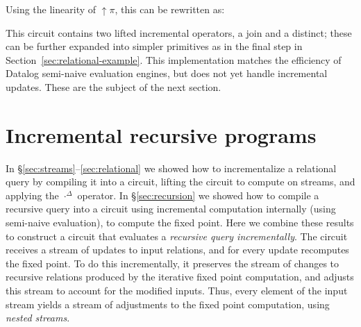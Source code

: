 \documentclass[twocolumn
]{svjour3}
\numberwithin{equation}{section}
\newcommand{\code}[1]{\mbox{\texttt{#1}}}
\newcommand{\zm}{\ensuremath{z^{-1}}} %
\newcommand{\inc}[1]{{#1}^{\Delta}}
\newcommand{\distinct}{\mathit{dist}}  %
\newcommand{\secref}[1]{\S\ref{#1}}  %
\newcommand{\lift}[1]{{\uparrow}#1}
\begin{document}
Using the linearity of $\lift\pi$, this can be rewritten as:

\noindent
{}

This circuit contains two lifted incremental operators, a join and a
distinct; these can be further expanded into simpler primitives as in
the final step in Section~\ref{sec:relational-example}.  This
implementation matches the efficiency of Datalog semi-naive evaluation
engines, but does not yet handle incremental updates.  These are the
subject of the next section.


%
\section{Incremental recursive programs}\label{sec:nested}

In \secref{sec:streams}--\ref{sec:relational}
we showed how to incrementalize a relational query by
compiling it into a circuit, lifting the circuit to compute on streams, and
applying the $\inc{\cdot}$ operator.  In \secref{sec:recursion} we showed
how to compile a recursive query into a circuit using incremental
computation internally (using semi-naive evaluation), to compute the fixed point.
Here we combine these results to construct a circuit that evaluates a \emph{recursive
query incrementally}.  The circuit receives a stream of updates to input
relations, and for every update recomputes the fixed point.  To do this
incrementally, it preserves the stream of changes to recursive relations
produced by the iterative fixed point computation, and adjusts this stream to
account for the modified inputs.  Thus, every element of the input stream yields
a stream of adjustments to the fixed point computation, using
\emph{nested streams}.
\end{document}
